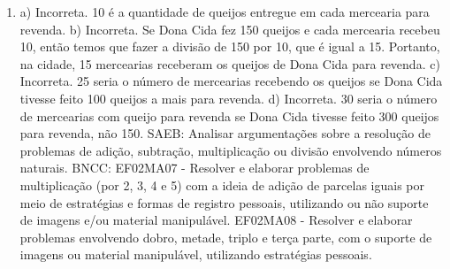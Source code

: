 \begin{enumerate}
\item
a) Incorreta. 10 é a quantidade de queijos entregue em cada
mercearia para revenda.
b) Incorreta. Se Dona Cida fez 150 queijos e cada mercearia recebeu 10,
então temos que fazer a divisão de 150 por 10, que é igual a 15.
Portanto, na cidade, 15 mercearias receberam os queijos de Dona Cida para
revenda.
c) Incorreta. 25 seria o número de mercearias recebendo os queijos se Dona Cida
tivesse feito 100 queijos a mais para revenda.
d) Incorreta. 30 seria o número de mercearias com queijo para revenda se Dona Cida
tivesse feito 300 queijos para revenda, não 150.
SAEB: Analisar argumentações sobre a resolução de problemas de
adição, subtração, multiplicação ou divisão envolvendo números naturais.
BNCC: EF02MA07 - Resolver e elaborar problemas de multiplicação (por 2,
3, 4 e 5) com a ideia de adição de parcelas iguais por meio de
estratégias e formas de registro pessoais, utilizando ou não suporte de
imagens e/ou material manipulável. EF02MA08 - Resolver e elaborar
problemas envolvendo dobro, metade, triplo e terça parte, com o suporte
de imagens ou material manipulável, utilizando estratégias pessoais.
\end{enumerate}

\blankpage